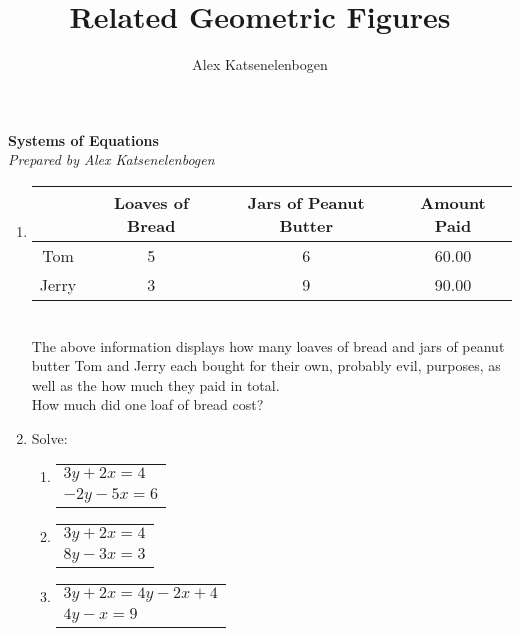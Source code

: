 \documentclass{article}
\title{Related Geometric Figures}
\author{Alex Katsenelenbogen}
\begin{document}
\begin{center}
      \Large\textbf{Systems of Equations}\\
      \large\textit{Prepared by Alex Katsenelenbogen}
   \end{center}

\begin{enumerate}

\item
\begin{tabular}[t]{c | c | c | c}
	   & Loaves of Bread & Jars of Peanut Butter & Amount Paid \\
        \hline
        Tom  & 5 & 6 & 60.00 \\
        Jerry & 3 & 9 & 90.00 \\
        \hline
\end{tabular} 
\vspace{0.3cm}
\\
 The above information displays how many loaves of bread and jars of peanut butter Tom and
Jerry each bought for their own, probably evil, purposes, as well as the how much they paid
in total.
\vspace{0.3cm} \\
How much did one loaf of bread cost?

\item
Solve:

\begin{enumerate}

\item
\begin{tabular}[t]{l}
$3y + 2x = 4$ \\
$-2y -5x = 6$ \\
\end{tabular}

\item
\begin{tabular}[t]{l}
$3y + 2x = 4$ \\
$8y -3x = 3$ \\
\end{tabular}

\item
\begin{tabular}[t]{l}
$3y + 2x = 4y - 2x + 4$ \\
$4y - x = 9$ \\
\end{tabular}

\end{enumerate}
\end{enumerate}
\end{document}
